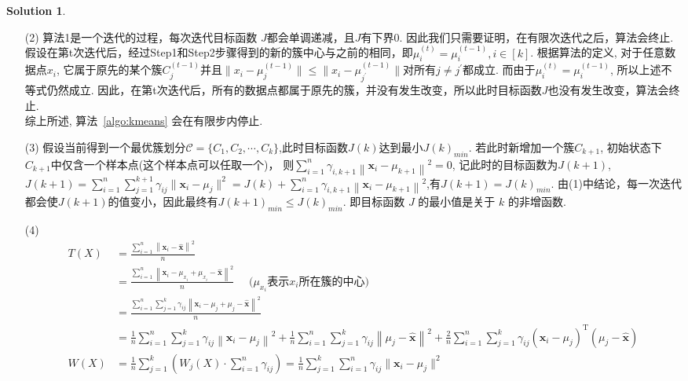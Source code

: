 \documentclass[a4paper,UTF8]{article}
\numberwithin{equation}{section}
\numberwithin{equation}{section}
\theoremstyle{definition}
\newtheorem*{solution}{Solution}
\begin{document}
\begin{solution}
\begin{enumerate}
        \item [(2)]
        算法1是一个迭代的过程，每次迭代目标函数 $J$都会单调递减，且$J$有下界0. 因此我们只需要证明，在有限次迭代之后，算法会终止. \\
        假设在第t次迭代后，经过Step1和Step2步骤得到的新的簇中心与之前的相同，即$\mu_i^{(t)} = \mu_i^{(t-1)}, i\in [k]$. 根据算法的定义, 对于任意数据点$x_i$, 它属于原先的某个簇$C_j^{(t-1)}$并且$\|x_i-\mu_j^{(t-1)}\| \leq \|x_i-\mu_{j^\prime}^{(t-1)}\|$对所有$j \neq j^{\prime}$都成立. 而由于$\mu_i^{(t)} = \mu_i^{(t-1)}$, 所以上述不等式仍然成立. 因此，在第t次迭代后，所有的数据点都属于原先的簇，并没有发生改变，所以此时目标函数$J$也没有发生改变，算法会终止. \\
        综上所述, 算法~\ref{algo:kmeans} 会在有限步内停止.
        \item [(3)]
        假设当前得到一个最优簇划分$\mathcal{C}=\{C_1,C_2,\cdots,C_k\}$,此时目标函数$J(k)$达到最小$J(k)_{min}$. 若此时新增加一个簇$C_{k+1}$, 初始状态下$C_{k+1}$中仅含一个样本点(这个样本点可以任取一个)， 则$\sum_{i=1}^{n} \gamma_{i,k+1}\left\|\mathbf{x}_{i}-\mu_{k+1}\right\|^{2}=0$, 记此时的目标函数为$J(k+1)$, $J(k+1)=\sum_{i=1}^n \sum_{j=1}^{k+1} \gamma_{ij}\|\mathbf x_i - \mu_j\|^2=J(k)+\sum_{i=1}^{n} \gamma_{i,k+1}\left\|\mathbf{x}_{i}-\mu_{k+1}\right\|^{2}$,有$J(k+1) = J(k)_{min}$. 由(1)中结论，每一次迭代都会使$J(k+1)$的值变小，因此最终有$J(k+1)_{min} \leq J(k)_{min}$. 即目标函数 $J$ 的最小值是关于 $k$ 的非增函数. 
        \item [(4)]
        \begin{align*} T(X) & =\frac{\sum_{i=1}^{n}\left\|\mathbf{x}_{i}-\hat{\mathbf{x}}\right\|^{2}}{n} \\ &= \frac{\sum_{i=1}^{n}\left\|\mathbf{x}_{i}- \mu_{x_i} + \mu_{x_i}-\hat{\mathbf{x}}\right\|^{2}}{n}\quad \text{ ($\mu_{x_i}$表示$x_i$所在簇的中心)} \\ &= \frac{\sum_{i=1}^{n}\sum_{j=1}^{k}\gamma_{ij}\left\|\mathbf{x}_{i}- \mu_{j} + \mu_{j}-\hat{\mathbf{x}}\right\|^{2}}{n}\\& =\frac{1}{n} \sum_{i=1}^{n}\sum_{j=1}^{k}\gamma_{ij}\left\|\mathbf{x}_{i}-\mu_{j}\right\|^{2}+\frac{1}{n} \sum_{i=1}^{n}\sum_{j=1}^{k}\gamma_{ij}\left\|\mu_{j}-\hat{\mathbf{x}}\right\|^{2}+ \frac{2}{n}\sum_{i=1}^{n}\sum_{j=1}^{k}\gamma_{ij}\left(\mathbf{x}_{i}-\mu_{j}\right)^{\mathrm{T}}\left(\mu_{j}-\hat{\mathbf{x}}\right) \\
        W(X) &=\frac{1}{n}\sum_{j=1}^{k}\left(W_j(X)\cdot\sum_{i=1}^n\gamma_{ij}\right)=\frac{1}{n}\sum_{j=1}^k \sum_{i=1}^n \gamma_{ij} \lVert\mathbf x_i - \mu_j \rVert^2 \\

\end{align*}
\end{enumerate}
\end{solution}
\end{document}
